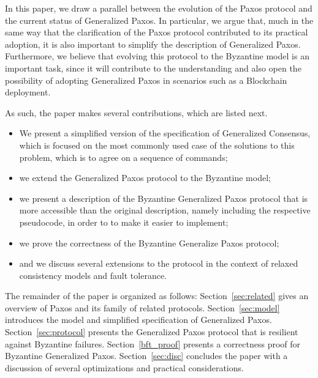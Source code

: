 
In this paper, we draw a parallel between the evolution of the Paxos
protocol and the current status of Generalized Paxos. In particular,
we argue that, much in the same way that the clarification of the Paxos
protocol contributed to its practical adoption, it is also important
to simplify the description of Generalized Paxos. Furthermore, we believe
that evolving this protocol to the Byzantine model is an important
task, since it will contribute to the understanding
and also open the possibility of adopting Generalized Paxos in
scenarios such as a Blockchain deployment.

As such, the paper makes several contributions, which are listed next.
%
\begin{itemize}
\item
We present a simplified version of the specification of Generalized
Consensus, which is focused on the most commonly used case of the
solutions to this problem, which is to agree on a sequence of
commands;

\item
we extend the Generalized Paxos protocol to the Byzantine model; 

\item
we present a description of the Byzantine Generalized Paxos protocol
that is more accessible than the original description, namely including the
respective pseudocode, in order to to make it 
easier to implement;

\item
we prove the correctness of the Byzantine Generalize Paxos protocol;

\item
and we discuss several extensions to the protocol in the context of relaxed consistency models and fault tolerance.
\end{itemize}
%
The remainder of the paper is organized as follows:
Section~\ref{sec:related} gives an overview of Paxos and its family of related protocols.
Section~\ref{sec:model} introduces the model and simplified specification of Generalized Paxos.
Section~\ref{sec:protocol} presents the Generalized Paxos protocol that is resilient against Byzantine failures. Section~\ref{bft_proof} presents a correctness proof for Byzantine Generalized Paxos.
Section~\ref{sec:disc} concludes the paper with a discussion of several optimizations and practical considerations.
%
